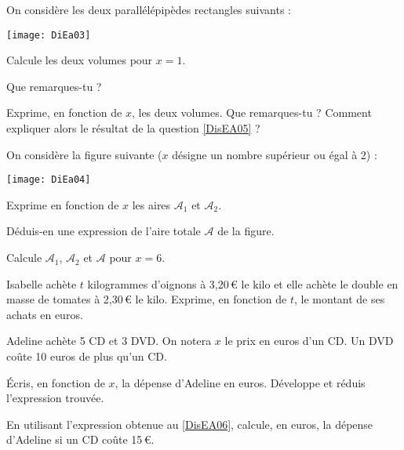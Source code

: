 


\begin{exercice}[]
On considère les deux parallélépipèdes rectangles suivants :
    
    \begin{center}
    \texttt{[image: DiEa03]}
    \end{center}

\begin{colenumerate}{1} 
\item \label{DisEA05} Calcule les deux volumes pour $x = 1$.

Que remarques-tu ?
\item Exprime, en fonction de $x$, les deux volumes. Que remarques-tu ? Comment expliquer alors le résultat de la question \ref{DisEA05} ?
\end{colenumerate} 
\end{exercice}




\begin{exercice}[]
On considère la figure suivante ($x$ désigne un nombre supérieur ou égal à 2) : 

    \begin{center}
    \texttt{[image: DiEa04]}
    \end{center}

\begin{colenumerate}{1} 
\item Exprime en fonction de $x$ les aires $\mathcal{A}_1$ et $\mathcal{A}_2$.
\item Déduis-en une expression de l'aire totale $\mathcal{A}$ de la figure.
\item Calcule $\mathcal{A}_1$, $\mathcal{A}_2$ et $\mathcal{A}$ pour $x = 6$.
\end{colenumerate} 
\end{exercice}




\begin{exercice}[]
Isabelle achète $t$ kilogrammes d'oignons à 3,20\,€ le kilo et elle achète le double en masse de tomates à 2,30\,€ le kilo. Exprime, en fonction de $t$, le montant de ses achats en euros.
\end{exercice}



\begin{exercice}[]
Adeline achète 5 CD et 3 DVD. On notera $x$ le prix en euros d'un CD. Un DVD coûte 10 euros de plus qu'un CD.

\begin{colenumerate}{1} 
\item \label{DisEA06} Écris, en fonction de $x$, la dépense d'Adeline en euros. Développe et réduis l'expression trouvée.
\item En utilisant l'expression obtenue au \ref{DisEA06}, calcule, en euros, la dépense d'Adeline si un CD coûte 15\,€.
\end{colenumerate} 
 
\end{exercice}

